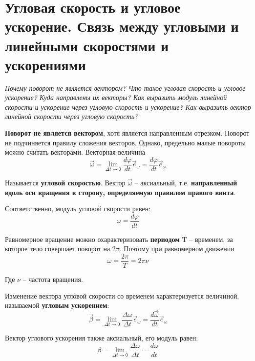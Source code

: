\documentclass{article}
\begin{document}
  \section{Угловая скорость и угловое ускорение. Связь между угловыми и линейными скоростями и ускорениями}
    \par
      \textit{Почему поворот не является вектором? Что такое угловая скорость и угловое ускорение? Куда направлены их векторы? Как выразить модуль линейной скорости и ускорение через угловую скорость и ускорение? Как выразить вектор линейной скорости через угловую скорость?}\\
    \par
      \textbf{Поворот не является вектором}, хотя является направленным отрезком. Поворот не подчиняется правилу сложения векторов. Однако, предельно малые повороты можно считать векторами. Векторная величина
      \begin{equation}
	\vec\omega=\lim_{\Delta t\rightarrow 0}{\frac{d\varphi}{dt}}\vec e_\omega=\frac{d\varphi}{dt}\vec e_\omega
      \end{equation}
    \par
      Называется \textbf{угловой скоростью}. Вектор $\vec\omega$ -- аксиальный, т.е. \textbf{направленный вдоль оси вращения в сторону, определяемую правилом правого винта}.
    \par
      Соответственно, модуль угловой скорости равен:
      \begin{equation}
	\omega=\frac{d\varphi}{dt}
      \end{equation}
    \par
      Равномерное вращение можно охарактеризовать \textbf{периодом} T -- временем, за которое тело совершает поворот на $2\pi$. Поэтому при равномерном движении 
      \begin{equation}
	\omega=\frac{2\pi}{T}=2\pi\nu
      \end{equation}
    \par
      Где $\nu$ -- частота вращения. 
    \par
      Изменение вектора угловой скорости со временем характеризуется величиной, называемой \textbf{угловым ускорением}:
      \begin{equation}
	\vec\beta=\lim_{\Delta t\rightarrow 0}{\frac{\Delta\omega}{\Delta t}}\vec e_\omega=\frac{d\vec\omega}{dt}\vec e_\omega
      \end{equation}
    \par
      Вектор углового ускорения также аксиальный, его модуль равен:
      \begin{equation}
	\beta=\lim_{\Delta t\rightarrow 0}{\frac{\Delta\omega}{\Delta t}}=\frac{d\omega}{dt}
      \end{equation}
\end{document}
